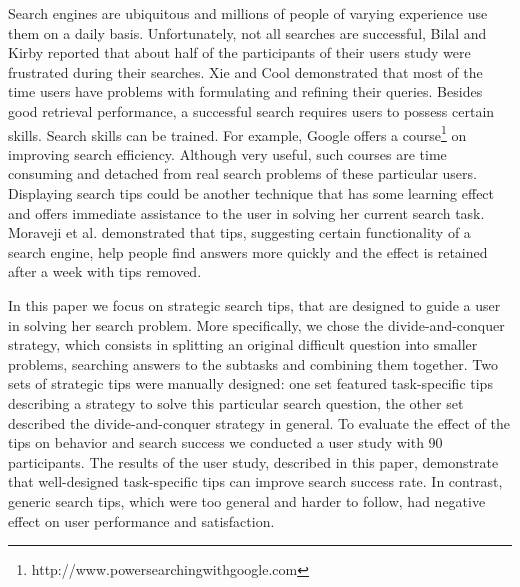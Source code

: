 \documentclass{sig-alternate}
\begin{document}
Search engines are ubiquitous and millions of people of varying experience use them on a daily basis.
Unfortunately, not all searches are successful, Bilal and Kirby \cite{Bilal:2002:DSI:637512.637516} reported that about half of the participants of their users study were frustrated during their searches.
Xie and Cool \cite{xie2009understanding} demonstrated that most of the time users have problems with formulating and refining their queries.
Besides good retrieval performance, a successful search requires users to possess certain skills.
Search skills can be trained. For example, Google offers a course\footnote{http://www.powersearchingwithgoogle.com} on improving search efficiency.
Although very useful, such courses are time consuming and detached from real search problems of these particular users. 
Displaying search tips could be another technique that has some learning effect and offers immediate assistance to the user in solving her current search task.
Moraveji et al. \cite{Moraveji:2011:MIU:2009916.2009966} demonstrated that tips, suggesting certain functionality of a search engine, help people find answers more quickly and the effect is retained after a week with tips removed.

In this paper we focus on strategic search tips, that are designed to guide a user in solving her search problem.
More specifically, we chose the divide-and-conquer strategy, which consists in splitting an original difficult question into smaller problems, searching answers to the subtasks and combining them together.
Two sets of strategic tips were manually designed: one set featured task-specific tips describing a strategy to solve this particular search question, the other set described the divide-and-conquer strategy in general.
To evaluate the effect of the tips on behavior and search success we conducted a user study with 90 participants.
The results of the user study, described in this paper, demonstrate that well-designed task-specific tips can improve search success rate.
In contrast, generic search tips, which were too general and harder to follow, had negative effect on user performance and satisfaction.
\end{document}
